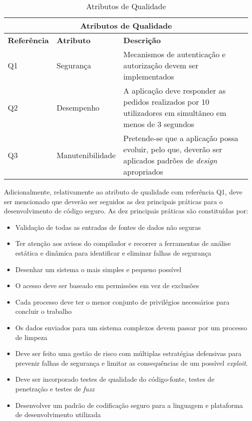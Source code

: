 \begin{table}[H]
\caption{Atributos de Qualidade}
\label{table:qualidades}
\begin{center}
\begin{tabular}{ |p{3cm}|p{3cm}|p{6cm}|  }
\hline
\multicolumn{3}{|c|}{Atributos de Qualidade} \\
\hline
\textbf{Referência} & \textbf{Atributo} & \textbf{Descrição} \\
\hline
Q1 & Segurança & Mecanismos de autenticação e autorização devem ser implementados\\
\hline
Q2 & Desempenho & A aplicação deve responder as pedidos realizados por 10 utilizadores em simultâneo em menos de 3 segundos\\
\hline
Q3 & Manutenibilidade & Pretende-se que a aplicação possa evoluir, pelo que, deverão ser aplicados padrões de \textit{design} apropriados\\
\hline
\end{tabular} 
\end{center}
\end{table}

Adicionalmente, relativamente ao atributo de qualidade com referência Q1, deve ser mencionado que deverão ser seguidos as dez principais práticas para o desenvolvimento de código seguro. As dez principais práticas são constituídas por:
\begin{itemize}
    \item Validação de todas as entradas de fontes de dados não seguras
    \item Ter atenção aos avisos do compilador e recorrer a ferramentas de análise estática e dinâmica para identificar e eliminar falhas de segurança
    \item Desenhar um sistema o mais simples e pequeno possível
    \item O acesso deve ser baseado em permissões em vez de exclusões
    \item Cada processo deve ter o menor conjunto de privilégios necessários para concluir o trabalho
    \item Os dados enviados para um sistema complexos devem passar por um processo de limpeza
    \item Deve ser feito uma gestão de risco com múltiplas estratégias defensivas para prevenir falhas de segurança e limitar as consequências de um possível \textit{exploit}. 
    \item Deve ser incorporado testes de qualidade do código-fonte, testes de penetração e testes de \textit{fuzz}
    \item Desenvolver um padrão de codificação seguro para a linguagem e plataforma de desenvolvimento utilizada
\end{itemize}

